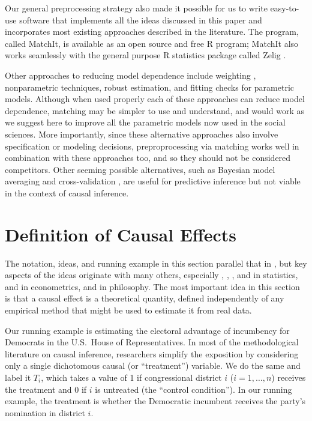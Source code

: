 \documentclass[11pt,titlepage]{article}
\begin{document}
Our general preprocessing strategy also made it possible for us to
write easy-to-use software that implements all the ideas discussed in
this paper and incorporates most existing approaches described in the
literature.  The program, called MatchIt, is available as an open
source and free R program; MatchIt also works seamlessly with the
general purpose R statistics package called Zelig \citep{ImaKinLau06}.

Other approaches to reducing model dependence include weighting
\citep{RobRot03, HirImbRid03}, nonparametric techniques, robust
estimation, and fitting checks for parametric models.  Although when
used properly each of these approaches can reduce model dependence,
matching may be simpler to use and understand, and would work as we
suggest here to improve all the parametric models now used in the
social sciences.  More importantly, since these alternative approaches
also involve specification or modeling decisions, preproprocessing via
matching works well in combination with these approaches too, and so
they should not be considered competitors.  Other seeming possible
alternatives, such as Bayesian model averaging
\citep{HoeMadRaf99,ImaKin04} and cross-validation \citep{BlaSmi04},
are useful for predictive inference but not viable in the context of
causal inference.

\section{Definition of Causal Effects}

The notation, ideas, and running example in this section parallel that
in \citet[][Section 3.1.1]{KinKeoVer94}, but key aspects of the ideas
originate with many others, especially \citet{Neyman23b},
\citet{Fisher35}, \citet{Cox58}, \citet{Rubin74} and \citet{Holland86}
in statistics, \citet{Roy51} and \citet{Quandt72} in econometrics, and
\citet{Lewis73} in philosophy.  The most important idea in this
section is that a causal effect is a theoretical quantity, defined
independently of any empirical method that might be used to estimate
it from real data.

Our running example is estimating the electoral advantage of
incumbency for Democrats in the U.S.\ House of Representatives.  In
most of the methodological literature on causal inference, researchers
simplify the exposition by considering only a single dichotomous
causal (or ``treatment'') variable.  We do the same and label it
$T_i$, which takes a value of 1 if congressional district $i$
($i=1,\dots,n$) receives the treatment and 0 if $i$ is untreated (the
``control condition'').  In our running example, the treatment is
whether the Democratic incumbent receives the party's nomination in
district $i$.
\end{document}
